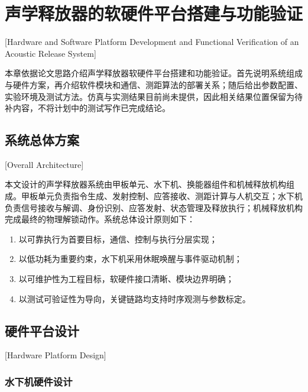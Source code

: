 
%
%

\chapter{声学释放器的软硬件平台搭建与功能验证}[Hardware and Software Platform Development and Functional Verification of an Acoustic Release System]
\label{chap05}

本章依据论文思路介绍声学释放器软硬件平台搭建和功能验证。首先说明系统组成与硬件方案，再介绍软件模块和通信、测距算法的部署关系；随后给出参数配置、实验环境及测试方法。仿真与实测结果目前尚未提供，因此相关结果位置保留为待补内容，不将计划中的测试写作已完成结论。

\section{系统总体方案}[Overall Architecture]

本文设计的声学释放器系统由甲板单元、水下机、换能器组件和机械释放机构组成。甲板单元负责指令生成、发射控制、应答接收、测距计算与人机交互；水下机负责信号接收与解调、身份识别、应答发射、状态管理及释放执行；机械释放机构完成最终的物理解锁动作。系统总体设计原则如下：

\begin{enumerate}
  \item 以可靠执行为首要目标，通信、控制与执行分层实现；
  \item 以低功耗为重要约束，水下机采用休眠唤醒与事件驱动机制；
  \item 以可维护性为工程目标，软硬件接口清晰、模块边界明确；
  \item 以测试可验证性为导向，关键链路均支持时序观测与参数标定。
\end{enumerate}

\section{硬件平台设计}[Hardware Platform Design]

\subsection{水下机硬件设计}

